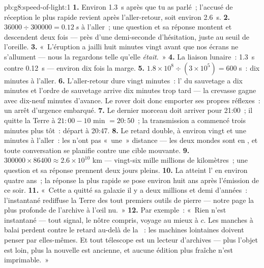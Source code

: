 \begin{solution}{pb:g8:speed-of-light:1}
\textbf{1.} Environ \qty{1.3}{s} après que tu as parlé~; l'accusé de
réception le plus rapide revient après l'aller-retour, soit environ
\qty{2.6}{s}.
\textbf{2.} $36000 \div 300000 = \qty{0.12}{s}$ à l'aller~; une
question et sa réponse montent et descendent deux fois --- près d'une
demi-seconde d'hésitation, juste au seuil de l'oreille.
\textbf{3.} «~L'éruption a jailli huit minutes vingt avant que nos
écrans ne s'allument --- nous la regardons telle qu'elle
\emph{était}.~»
\textbf{4.} La liaison lunaire~: \qty{1.3}{s} contre \qty{0.12}{s}
--- environ dix fois la marge.
\textbf{5.} $1.8 \times 10^{8} \div (3 \times 10^{5}) = 600$ s~: dix
minutes à l'aller.
\textbf{6.} L'aller-retour dure vingt minutes~: l' du sauvetage
a dix minutes et l'ordre de sauvetage arrive dix minutes trop tard ---
la crevasse gagne avec dix-neuf minutes d'avance. Le rover doit donc
emporter ses propres réflexes~: un arrêt d'urgence embarqué.
\textbf{7.} Le dernier morceau doit arriver pour 21:00~; il quitte la
Terre à $21{:}00 - 10$ min $= 20{:}50$~; la transmission a commencé
trois minutes plus tôt~: départ à 20:47.
\textbf{8.} Le retard double, à environ vingt et une minutes à
l'aller~: les  n'ont pas «~une~» distance --- les deux mondes
sont en , et toute conversation se planifie contre une cible
mouvante.
\textbf{9.} $300000 \times 86400 \approx 2.6 \times 10^{10}$ km ---
vingt-six mille millions de kilomètres~; une question et sa réponse
prennent deux jours pleins.
\textbf{10.} La  atteint l' en environ quatre ans~; la
réponse la plus rapide se pose environ huit ans après l'émission de ce
soir.
\textbf{11.} «~Cette  a quitté sa galaxie il y a deux millions
et demi d'années~: l'instantané rediffuse la Terre des tout premiers
outils de pierre --- notre page la plus profonde de l'archive à
l'œil nu.~»
\textbf{12.} Par exemple~: «~Rien n'est instantané --- tout signal, le
nôtre compris, voyage au mieux à $c$. Les manches à balai perdent
contre le retard au-delà de la ~: les machines lointaines doivent
penser par elles-mêmes. Et tout télescope est un lecteur d'archives
--- plus l'objet est loin, plus la nouvelle est ancienne, et aucune
édition plus fraîche n'est imprimable.~»
\end{solution}

